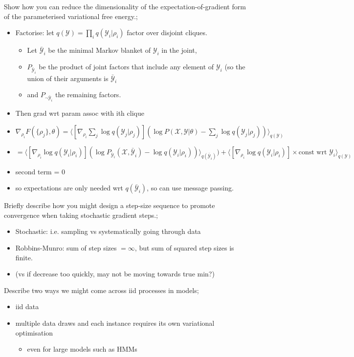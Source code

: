 \documentclass{article}
\begin{document}
Show how you can reduce the dimensionality of the expectation-of-gradient form of the parameterised variational free energy.; \begin{itemize}
    \item Factorise: let $q(\mathcal{Y}) = \prod_i q(\mathcal{Y}_i|\rho_i)$ factor over disjoint cliques. \begin{itemize}
        \item Let $\bar{\mathcal{Y}}_i$ be the minimal Markov blanket of $\mathcal{Y}_i$ in the joint, \item $P_{\bar{\mathcal{Y}}_i}$ be the product of joint factors that include any element of $\mathcal{Y}_i$ (so the union of their arguments is $\bar{\mathcal{Y}}_i$
        \item and $P_{\neg \bar{\mathcal{Y}}_i}$ the remaining factors.
    \end{itemize}
    \item Then grad wrt param assoc with ith clique
    \item $\nabla_{\rho_i}F(\{\rho_j\}, \theta) = \langle [\nabla_{\rho_i} \sum_j \log q(\mathcal{Y}_j | \rho_j)](\log P(\mathcal{X, Y}|\theta) - \sum_j \log q(\mathcal{Y}_j|\rho_j)) \rangle_{q(\mathcal{Y})}$
    \item $=\langle [\nabla_{\rho_i} \log q(\mathcal{Y}_i | \rho_i)](\log P_{\bar{\mathcal{Y}}_i}(\mathcal{X, \bar{\mathcal{Y}}}_i) - \log q(\mathcal{Y}_i|\rho_i)) \rangle_{q(\bar{\mathcal{Y}}_i)}) + \langle [\nabla_{\rho_i} \log q(\mathcal{Y}_i | \rho_i)]\times\text{const wrt }\mathcal{Y}_i \rangle_{q(\mathcal{Y})}$
    \item second term = 0
    \item so expectations are only needed wrt $q(\bar{\mathcal{Y}}_i)$, so can use message passing.
    
\end{itemize}

Briefly describe how you might design a step-size sequence to promote convergence when taking stochastic gradient steps.; \begin{itemize}
    \item Stochastic: i.e. sampling vs systematically going through data
    \item Robbins-Munro: sum of step sizes $=\infty$, but sum of squared step sizes is finite.
    \item (vs if decrease too quickly, may not be moving towards true min?)
\end{itemize}

Describe two ways we might come across iid processes in models; \begin{itemize}
    \item iid data
    \item multiple data draws and each instance requires its own variational optimisation \begin{itemize}
        \item even for large models such as HMMs
    \end{itemize}
\end{itemize}
\end{document}
